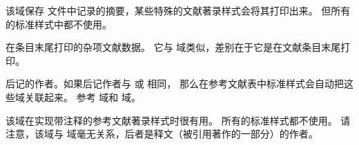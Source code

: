 \begin{fieldlist}




该域保存 文件中记录的摘要，某些特殊的文献著录样式会将其打印出来。
但所有的标准样式中都不使用。




在条目末尾打印的杂项文献数据。
它与  域类似，差别在于它是在文献条目末尾打印。




后记的作者。如果后记作者与  或  相同，
那么在参考文献表中标准样式会自动把这些域关联起来。
参考  域和  域。




该域在实现带注释的参考文献著录样式时很有用。
所有的标准样式都不使用。
请注意，该域与  域毫无关系，后者是释文（被引用著作的一部分）的作者。




\end{fieldlist}
